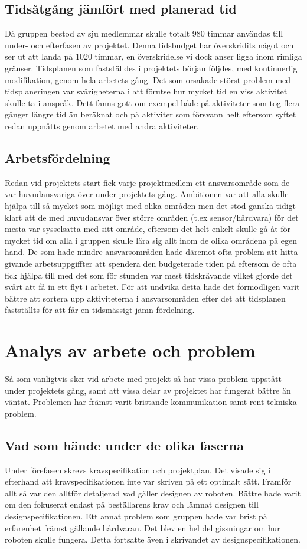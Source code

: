 \documentclass[a4paper,12pt]{article}
\begin{document}
\subsection{Tidsåtgång jämfört med planerad tid}
Då gruppen bestod av sju medlemmar skulle totalt 980 timmar användas till under- och efterfasen av projektet. Denna tidsbudget har överskridits något och ser ut att landa på 1020 timmar, en överskridelse vi dock anser ligga inom rimliga gränser. Tidsplanen som fastställdes i projektets början följdes, med kontinuerlig modifikation, genom hela arbetets gång. Det som orsakade störst problem med tidsplaneringen var svårigheterna i att förutse hur mycket tid en viss aktivitet skulle ta i anspråk. Dett fanns gott om exempel både på aktiviteter som tog flera gånger längre tid än beräknat och på aktiviter som försvann helt eftersom syftet redan uppnåtts genom arbetet med andra aktiviteter.
\subsection{Arbetsfördelning}
Redan vid projektets start fick varje projektmedlem ett ansvarsområde som de var huvudansvariga över under projektets gång. Ambitionen var att alla skulle hjälpa till så mycket som möjligt med olika områden men det stod ganska tidigt klart att de med huvudansvar över större områden (t.ex sensor/hårdvara) för det mesta var sysselsatta med sitt område, eftersom det helt enkelt skulle gå åt för mycket tid om alla i gruppen skulle lära sig allt inom de olika områdena på egen hand. De som hade mindre ansvarsområden hade däremot ofta problem att hitta givande arbetsuppgiffter att spendera den budgeterade tiden på eftersom de ofta fick hjälpa till med det som för stunden var mest tidskrävande vilket gjorde det svårt att få in ett flyt i arbetet.
För att undvika detta hade det förmodligen varit bättre att sortera upp aktiviteterna i ansvarsområden efter det att tidsplanen fastställts för att får en tidsmässigt jämn fördelning.

\section{Analys av arbete och problem}
Så som vanligtvis sker vid arbete med projekt så har vissa problem uppstått under projektets gång, samt att vissa delar av projektet har fungerat
bättre än väntat. Problemen har främst varit bristande kommunikation samt rent tekniska problem. 

\subsection{Vad som hände under de olika faserna}
 Under förefasen skrevs kravspecifikation och projektplan. Det visade sig i efterhand att kravspecifikationen inte var skriven på ett optimalt sätt. 
Framför allt så var den alltför detaljerad vad gäller designen av roboten. Bättre hade varit om den fokuserat endast på beställarens krav och lämnat designen till designspecifikationen. 
Ett annat problem som gruppen hade var brist på erfarenhet främst gällande hårdvaran. Det blev en hel 
del gissningar om hur roboten skulle fungera. Detta fortsatte även i skrivandet av designspecifikationen. 
\end{document}
